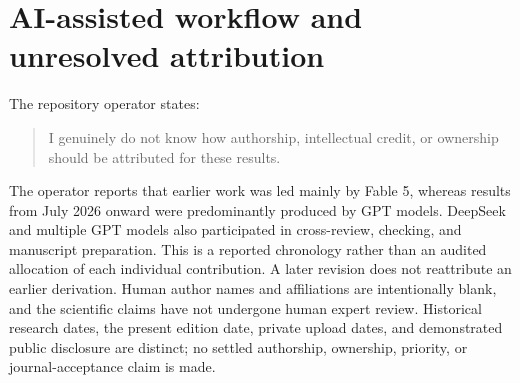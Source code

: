 \documentclass[11pt,a4paper]{article}
\theoremstyle{remark}\newtheorem{remark}[theorem]{Remark}
\begin{document}
\section*{AI-assisted workflow and unresolved attribution}
The repository operator states:
\begin{quote}
I genuinely do not know how authorship, intellectual credit, or ownership should be attributed for these results.
\end{quote}
The operator reports that earlier work was led mainly by Fable 5, whereas results from July 2026 onward were predominantly produced by GPT models.
DeepSeek and multiple GPT models also participated in cross-review, checking, and manuscript preparation.
This is a reported chronology rather than an audited allocation of each individual contribution.
A later revision does not reattribute an earlier derivation.
Human author names and affiliations are intentionally blank, and the scientific claims have not undergone human expert review.
Historical research dates, the present edition date, private upload dates, and demonstrated public disclosure are distinct; no settled authorship, ownership, priority, or journal-acceptance claim is made.


\end{document}
